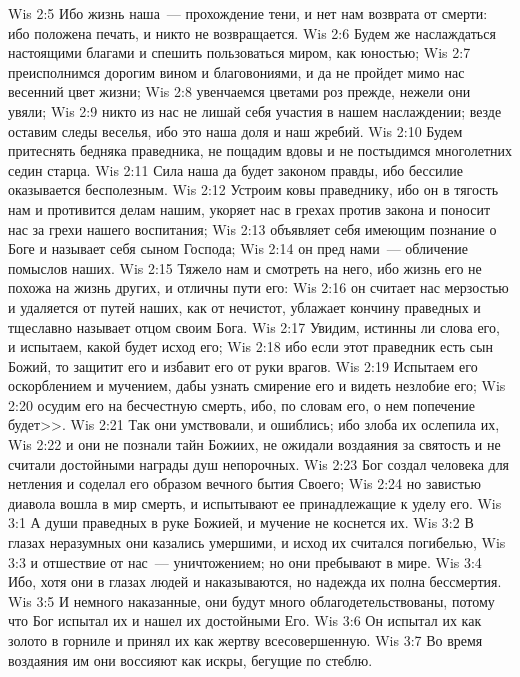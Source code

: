 \vs Wis 2:5 Ибо жизнь наша~--- прохождение тени, и нет нам возврата от смерти: ибо положена печать, и никто не возвращается.
\vs Wis 2:6 Будем же наслаждаться настоящими благами и спешить пользоваться миром, как юностью;
\vs Wis 2:7 преисполнимся дорогим вином и благовониями, и да не пройдет мимо нас весенний цвет жизни;
\vs Wis 2:8 увенчаемся цветами роз прежде, нежели они увяли;
\vs Wis 2:9 никто из нас не лишай себя участия в нашем наслаждении; везде оставим следы веселья, ибо это наша доля и наш жребий.
\vs Wis 2:10 Будем притеснять бедняка праведника, не пощадим вдовы и не постыдимся многолетних седин старца.
\vs Wis 2:11 Сила наша да будет законом правды, ибо бессилие оказывается бесполезным.
\vs Wis 2:12 Устроим ковы праведнику, ибо он в тягость нам и противится делам нашим, укоряет нас в грехах против закона и поносит нас за грехи нашего воспитания;
\vs Wis 2:13 объявляет себя имеющим познание о Боге и называет себя сыном Господа;
\vs Wis 2:14 он пред нами~--- обличение помыслов наших.
\vs Wis 2:15 Тяжело нам и смотреть на него, ибо жизнь его не похожа на жизнь других, и отличны пути его:
\vs Wis 2:16 он считает нас мерзостью и удаляется от путей наших, как от нечистот, ублажает кончину праведных и тщеславно называет отцом своим Бога.
\vs Wis 2:17 Увидим, истинны ли слова его, и испытаем, какой будет исход его;
\vs Wis 2:18 ибо если этот праведник есть сын Божий, то  защитит его и избавит его от руки врагов.
\vs Wis 2:19 Испытаем его оскорблением и мучением, дабы узнать смирение его и видеть незлобие его;
\vs Wis 2:20 осудим его на бесчестную смерть, ибо, по словам его, о нем попечение будет>>.
\vs Wis 2:21 Так они умствовали, и ошиблись; ибо злоба их ослепила их,
\vs Wis 2:22 и они не познали тайн Божиих, не ожидали воздаяния за святость и не считали достойными награды душ непорочных.
\vs Wis 2:23 Бог создал человека для нетления и соделал его образом вечного бытия Своего;
\vs Wis 2:24 но завистью диавола вошла в мир смерть, и испытывают ее принадлежащие к уделу его.
\vs Wis 3:1 А души праведных в руке Божией, и мучение не коснется их.
\vs Wis 3:2 В глазах неразумных они казались умершими, и исход их считался погибелью,
\vs Wis 3:3 и отшествие от нас~--- уничтожением; но они пребывают в мире.
\vs Wis 3:4 Ибо, хотя они в глазах людей и наказываются, но надежда их полна бессмертия.
\vs Wis 3:5 И немного наказанные, они будут много облагодетельствованы, потому что Бог испытал их и нашел их достойными Его.
\vs Wis 3:6 Он испытал их как золото в горниле и принял их как жертву всесовершенную.
\vs Wis 3:7 Во время воздаяния им они воссияют как искры, бегущие по стеблю.
